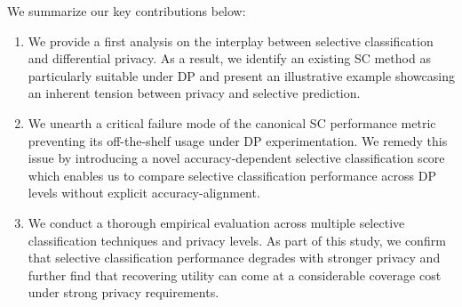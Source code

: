We summarize our key contributions below: 
\begin{enumerate}[leftmargin=15pt]
	
     \item We provide a first analysis on the interplay between selective classification and differential privacy. As a result, we identify an existing SC method as particularly suitable under DP and present an illustrative example showcasing an inherent tension between privacy and selective prediction. 
     \item We unearth a critical failure mode of the canonical SC performance metric preventing its off-the-shelf usage under DP experimentation. We remedy this issue by introducing a novel accuracy-dependent selective classification score which enables us to compare selective classification performance across DP levels without explicit accuracy-alignment.
     \item We conduct a thorough empirical evaluation across multiple selective classification techniques and privacy levels. As part of this study, we confirm that selective classification performance degrades with stronger privacy 
     and further find that recovering utility can come at a considerable coverage cost under strong privacy requirements.
     
\end{enumerate}



